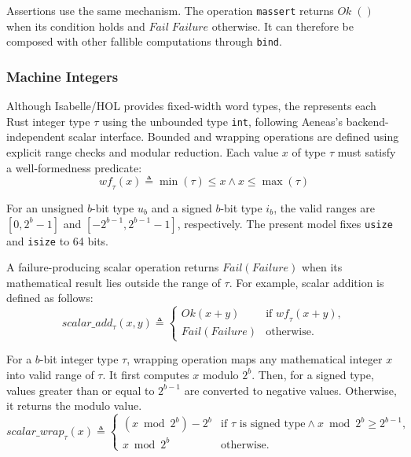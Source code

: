 Assertions use the same mechanism.  The operation \texttt{massert} returns \(\mathit{Ok}\;()\) when its condition holds and \(\mathit{Fail}\;\mathit{Failure}\) otherwise. It can therefore be composed with other fallible computations through \texttt{bind}.

\subsubsection{Machine Integers}

Although Isabelle/HOL provides fixed-width word types, the \rprelude{} represents each Rust integer type $\tau$ using the unbounded type \texttt{int}, following Aeneas's backend-independent scalar interface.
Bounded and wrapping operations are defined using explicit range checks and modular reduction. Each value $x$ of type $\tau$ must satisfy a
well-formedness predicate:
\begin{equation}
  \mathit{wf}_\tau(x) \triangleq
  \min(\tau) \leq x \land x \leq \max(\tau)
\end{equation}

For an unsigned $b$-bit type $u_b$ and a signed $b$-bit type $i_b$, the valid ranges are $[0, 2^b-1]$ and $[-2^{b-1}, 2^{b-1}-1]$, respectively.
The present model fixes \texttt{usize} and \texttt{isize} to 64 bits.

A failure-producing scalar operation returns $\mathit{Fail}(\mathit{Failure})$ when its mathematical result lies outside the range of $\tau$. For example, scalar addition is defined as follows:
\begin{equation}
    \mathit{scalar\_add}_\tau(x,y) \triangleq
    \begin{cases}
        \mathit{Ok}(x+y) & \text{if }\mathit{wf}_\tau(x+y),\\
        \mathit{Fail}(\mathit{Failure}) & \text{otherwise.}
    \end{cases}
\end{equation}

For a $b$-bit integer type $\tau$, wrapping operation maps any mathematical integer $x$ into valid range of $\tau$.
It first computes $x$ modulo $2^b$. Then, for a signed type, values greater than or equal to $2^{b-1}$ are converted to negative values.
Otherwise, it returns the modulo value.
\begin{equation}
  \mathit{scalar\_wrap}_\tau(x) \triangleq
  \begin{cases}
    (x \bmod 2^{b}) - 2^b
      & \text{if }\tau\text{ is signed type}
        \land x \bmod 2^{b} \geq 2^{b-1},\\
    x \bmod 2^{b} & \text{otherwise.}
  \end{cases}
\end{equation}

